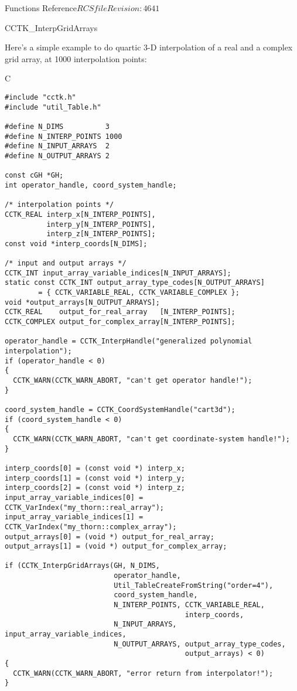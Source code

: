 \begin{cactuspart}{ Functions Reference}{$RCSfile$}{$Revision: 4641 $}
\begin{FunctionDescription}{CCTK\_InterpGridArrays}
\begin{ExampleSection}
\begin{ExampleDescription}
Here's a simple example to do quartic 3-D interpolation of a real
and a complex grid array, at 1000 interpolation points:
\end{ExampleDescription}
\begin{Example}{C}
\begin{verbatim}
#include "cctk.h"
#include "util_Table.h"

#define N_DIMS          3
#define N_INTERP_POINTS 1000
#define N_INPUT_ARRAYS  2
#define N_OUTPUT_ARRAYS 2

const cGH *GH;
int operator_handle, coord_system_handle;

/* interpolation points */
CCTK_REAL interp_x[N_INTERP_POINTS],
          interp_y[N_INTERP_POINTS],
          interp_z[N_INTERP_POINTS];
const void *interp_coords[N_DIMS];

/* input and output arrays */
CCTK_INT input_array_variable_indices[N_INPUT_ARRAYS];
static const CCTK_INT output_array_type_codes[N_OUTPUT_ARRAYS]
        = { CCTK_VARIABLE_REAL, CCTK_VARIABLE_COMPLEX };
void *output_arrays[N_OUTPUT_ARRAYS];
CCTK_REAL    output_for_real_array   [N_INTERP_POINTS];
CCTK_COMPLEX output_for_complex_array[N_INTERP_POINTS];

operator_handle = CCTK_InterpHandle("generalized polynomial interpolation");
if (operator_handle < 0)
{
  CCTK_WARN(CCTK_WARN_ABORT, "can't get operator handle!");
}

coord_system_handle = CCTK_CoordSystemHandle("cart3d");
if (coord_system_handle < 0)
{
  CCTK_WARN(CCTK_WARN_ABORT, "can't get coordinate-system handle!");
}

interp_coords[0] = (const void *) interp_x;
interp_coords[1] = (const void *) interp_y;
interp_coords[2] = (const void *) interp_z;
input_array_variable_indices[0] = CCTK_VarIndex("my_thorn::real_array");
input_array_variable_indices[1] = CCTK_VarIndex("my_thorn::complex_array");
output_arrays[0] = (void *) output_for_real_array;
output_arrays[1] = (void *) output_for_complex_array;

if (CCTK_InterpGridArrays(GH, N_DIMS,
                          operator_handle,
                          Util_TableCreateFromString("order=4"),
                          coord_system_handle,
                          N_INTERP_POINTS, CCTK_VARIABLE_REAL,
                                           interp_coords,
                          N_INPUT_ARRAYS, input_array_variable_indices,
                          N_OUTPUT_ARRAYS, output_array_type_codes,
                                           output_arrays) < 0)
{
  CCTK_WARN(CCTK_WARN_ABORT, "error return from interpolator!");
}
\end{verbatim}
\end{Example}
\end{ExampleSection}
\end{FunctionDescription}


\end{cactuspart}
